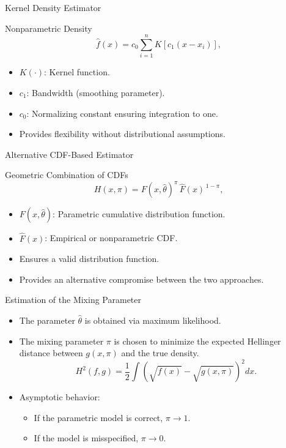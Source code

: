 \begin{frame}{Kernel Density Estimator}
\begin{block}{Nonparametric Density}
\begin{equation}
    \hat{f}(x) = c_0 \sum_{i=1}^{n} K\!\left[c_1(x - x_i)\right],
\end{equation}
\end{block}

\begin{itemize}
    \item $K(\cdot)$: Kernel function.
    \item $c_1$: Bandwidth (smoothing parameter).
    \item $c_0$: Normalizing constant ensuring integration to one.
    \item Provides flexibility without distributional assumptions.
\end{itemize}
\end{frame}

\begin{frame}{Alternative CDF-Based Estimator}
\begin{block}{Geometric Combination of CDFs}
\begin{equation}
    H(x,\pi) = F(x,\hat{\theta})^{\pi}\,\hat{F}(x)^{\,1-\pi},
\end{equation}
\end{block}

\begin{itemize}
    \item $F(x,\hat{\theta})$: Parametric cumulative distribution function.
    \item $\hat{F}(x)$: Empirical or nonparametric CDF.
    \item Ensures a valid distribution function.
    \item Provides an alternative compromise between the two approaches.
\end{itemize}
\end{frame}

\begin{frame}{Estimation of the Mixing Parameter}
\begin{itemize}
    \item The parameter $\hat{\theta}$ is obtained via maximum likelihood.
    \item The mixing parameter $\pi$ is chosen to minimize the expected Hellinger distance between $g(x,\pi)$ and the true density.
    \begin{equation}
        H^2(f,g) = \frac{1}{2} \int \left(\sqrt{f(x)} - \sqrt{g(x,\pi)}\right)^2 dx.
    \end{equation}
    \item Asymptotic behavior:
    \begin{itemize}
        \item If the parametric model is correct, $\pi \to 1$.
        \item If the model is misspecified, $\pi \to 0$.
    \end{itemize}
\end{itemize}
\end{frame}

